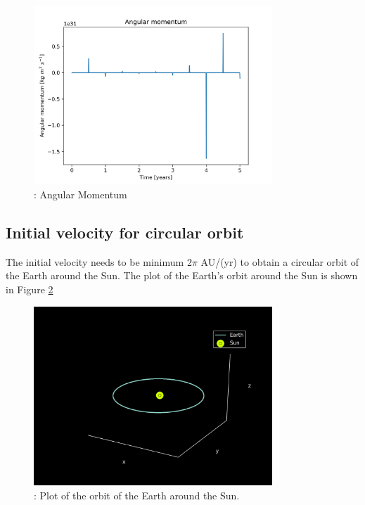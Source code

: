 \documentclass{article}
\begin{document}
\begin{figure}[H]
    \begin{center}
        \includegraphics[width=0.8\textwidth]{./Plot/angular_momentum.png}
        \caption{: Angular Momentum}
        \label{fig:am}
    \end{center}
\end{figure}

\subsection{Initial velocity for circular orbit}
The initial velocity needs to be minimum 2$\pi$ AU/(yr) to obtain a circular orbit of the Earth around the Sun.
The plot of the Earth's orbit around the Sun is shown in Figure \ref{fig:earth_orbit}

\begin{figure}[H]
    \begin{center}
        \includegraphics[width=0.8\textwidth]{./Plot/Earth_orbit.png}
        \caption{: Plot of the orbit of the Earth around the Sun.}
        \label{fig:earth_orbit}
    \end{center}
\end{figure}
\end{document}

